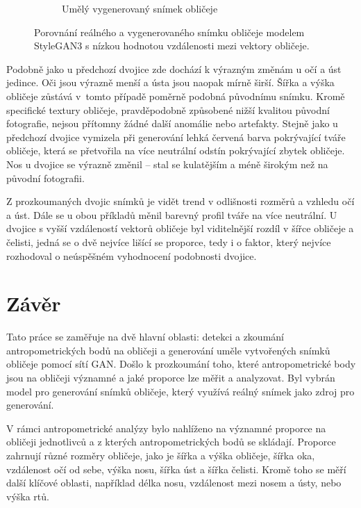 \begin{figure}[H]
\begin{subfigure}{0.45\textwidth}
         \caption{Umělý vygenerovaný snímek obličeje}
         \label{fig:personal-090-gen}
     \end{subfigure}
    \caption{Porovnání reálného a vygenerovaného snímku obličeje modelem StyleGAN3 s nízkou hodnotou vzdálenosti mezi vektory obličeje.}
    \label{fig:personal-090}
\end{figure}

Podobně jako u předchozí dvojice zde dochází k výrazným změnám u očí a úst jedince. Oči jsou výrazně menší a ústa jsou naopak mírně širší. Šířka a výška obličeje zůstává v~tomto případě poměrně podobná původnímu snímku. Kromě specifické textury obličeje, pravděpodobně způsobené nižší kvalitou původní fotografie, nejsou přítomny žádné další anomálie nebo artefakty. Stejně jako u předchozí dvojice vymizela při generování lehká červená barva pokrývající tváře obličeje, která se přetvořila na více neutrální odstín pokrývající zbytek obličeje. Nos u dvojice se výrazně změnil – stal se kulatějším a méně širokým než na původní fotografii.

\bigskip

\noindent Z prozkoumaných dvojic snímků je vidět trend v odlišnosti rozměrů a vzhledu očí a úst. Dále se u obou příkladů měnil barevný profil tváře na více neutrální. U dvojice s vyšší vzdáleností vektorů obličeje byl viditelnější rozdíl v šířce obličeje a čelisti, jedná se o dvě nejvíce lišící se proporce, tedy i o faktor, který nejvíce rozhodoval o neúspěšném vyhodnocení podobnosti dvojice.

\chapter{Závěr}
\label{zaver}

Tato práce se zaměřuje na dvě hlavní oblasti: detekci a zkoumání antropometrických bodů na obličeji a generování uměle vytvořených snímků obličeje pomocí sítí GAN. Došlo k prozkoumání toho, které antropometrické body jsou na obličeji významné a jaké proporce lze měřit a analyzovat. Byl vybrán model pro generování snímků obličeje, který využívá reálný snímek jako zdroj pro generování. 

V rámci antropometrické analýzy bylo nahlíženo na významné proporce na obličeji jednotlivců a z kterých antropometrických bodů se skládají. Proporce zahrnují různé rozměry obličeje, jako je šířka a výška obličeje, šířka oka, vzdálenost očí od sebe, výška nosu, šířka úst a šířka čelisti. Kromě toho se měří další klíčové oblasti, například délka nosu, vzdálenost mezi nosem a ústy, nebo výška rtů.


